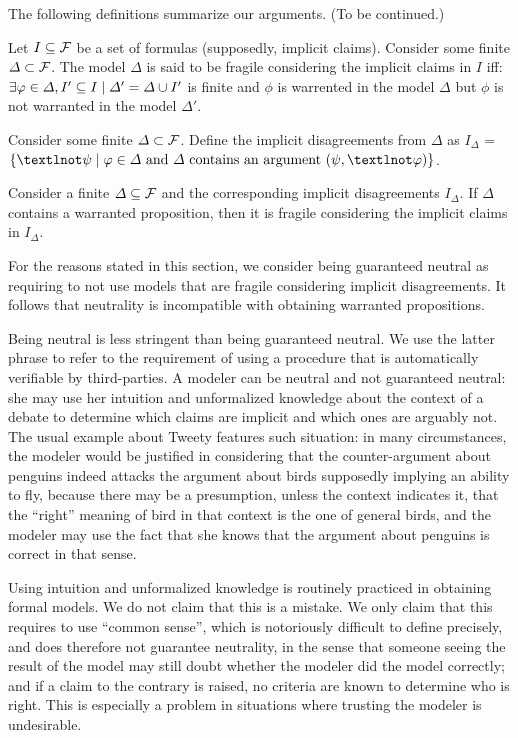 \documentclass[version=3.21, pagesize, twoside=off, bibliography=totoc, DIV=calc, fontsize=12pt, a4paper, french, english]{scrartcl}
\begin{document}
The following definitions summarize our arguments. (To be continued.)
\begin{definition}
	Let $I \subseteq \mathcal{F}$ be a set of formulas (supposedly, implicit claims). Consider some finite $\Delta \subset \mathcal{F}$. The model $\Delta$ is said to be fragile considering the implicit claims in $I$ iff: $\exists \phi \in \Delta, I' \subseteq I \suchthat \Delta' = \Delta \cup I'$ is finite and $\phi$ is warrented in the model $\Delta$ but $\phi$ is not warranted in the model $\Delta'$.
\end{definition}
\begin{definition}
	Consider some finite $\Delta \subset \mathcal{F}$. Define the implicit disagreements from $\Delta$ as $I_\Delta$ = $\set{¬\psi \suchthat \phi \in \Delta \text{ and } \Delta \text{ contains an argument } (\psi, ¬\phi)}$.
\end{definition}

\begin{conjecture}
	Consider a finite $\Delta \subseteq \mathcal{F}$ and the corresponding implicit disagreements $I_\Delta$. If $\Delta$ contains a warranted proposition, then it is fragile considering the implicit claims in $I_\Delta$.
\end{conjecture}

For the reasons stated in this section, we consider being guaranteed neutral as requiring to not use models that are fragile considering implicit disagreements. It follows that neutrality is incompatible with obtaining warranted propositions.

\begin{remark}
	Being neutral is less stringent than being guaranteed neutral. We use the latter phrase to refer to the requirement of using a procedure that is automatically verifiable by third-parties. A modeler can be neutral and not guaranteed neutral: she may use her intuition and unformalized knowledge about the context of a debate to determine which claims are implicit and which ones are arguably not. The usual example about Tweety features such situation: in many circumstances, the modeler would be justified in considering that the counter-argument about penguins indeed attacks the argument about birds supposedly implying an ability to fly, because there may be a presumption, unless the context indicates it, that the “right” meaning of bird in that context is the one of general birds, and the modeler may use the fact that she knows that the argument about penguins is correct in that sense. 
	
	Using intuition and unformalized knowledge is routinely practiced in obtaining formal models. 
	We do not claim that this is a mistake. We only claim that this requires to use “common sense”, which is notoriously difficult to define precisely, and does therefore not guarantee neutrality, in the sense that someone seeing the result of the model may still doubt whether the modeler did the model correctly; and if a claim to the contrary is raised, no criteria are known to determine who is right. This is especially a problem in situations where trusting the modeler is undesirable.
\end{remark}
\end{document}
